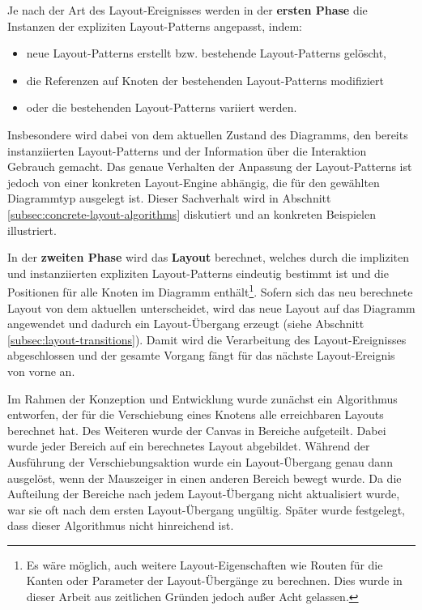 Je nach der Art des Layout-Ereignisses werden in der \textbf{ersten Phase} die Instanzen der expliziten Layout-Patterns angepasst, indem:

\begin{itemize}
    \item neue Layout-Patterns erstellt bzw. bestehende  Layout-Patterns gelöscht,
    \item die Referenzen auf Knoten der bestehenden Layout-Patterns modifiziert
    \item oder die bestehenden Layout-Patterns variiert werden.
\end{itemize}

Insbesondere wird dabei von dem aktuellen Zustand des Diagramms, den bereits instanziierten Layout-Patterns und der Information über die Interaktion Gebrauch gemacht. Das genaue Verhalten der Anpassung der Layout-Patterns ist jedoch von einer konkreten Layout-Engine abhängig, die für den gewählten Diagrammtyp ausgelegt ist. Dieser Sachverhalt wird in Abschnitt \ref{subsec:concrete-layout-algorithms} diskutiert und an konkreten Beispielen illustriert.

In der \textbf{zweiten Phase} wird das \textbf{Layout} berechnet, welches durch die impliziten und instanziierten expliziten Layout-Patterns eindeutig bestimmt ist und die Positionen für alle Knoten im Diagramm enthält\footnote{Es wäre möglich, auch weitere Layout-Eigenschaften wie Routen für die Kanten oder Parameter der Layout-Übergänge zu berechnen. Dies wurde in dieser Arbeit aus zeitlichen Gründen jedoch außer Acht gelassen.}. Sofern sich das neu berechnete Layout von dem aktuellen unterscheidet, wird das neue Layout auf das Diagramm angewendet und dadurch ein Layout-Übergang erzeugt (siehe Abschnitt \ref{subsec:layout-transitions}). Damit wird die Verarbeitung des Layout-Ereignisses abgeschlossen und der gesamte Vorgang fängt für das nächste Layout-Ereignis von vorne an.

Im Rahmen der Konzeption und Entwicklung wurde zunächst ein Algorithmus entworfen, der für die Verschiebung eines Knotens alle erreichbaren Layouts berechnet hat. Des Weiteren wurde der Canvas in Bereiche aufgeteilt. Dabei wurde jeder Bereich auf ein berechnetes Layout abgebildet. Während der Ausführung der Verschiebungsaktion wurde ein Layout-Übergang genau dann ausgelöst, wenn der Mauszeiger in einen anderen Bereich bewegt wurde. Da die Aufteilung der Bereiche nach jedem Layout-Übergang nicht aktualisiert wurde, war sie oft nach dem ersten Layout-Übergang ungültig. Später wurde festgelegt, dass dieser Algorithmus nicht hinreichend ist.

